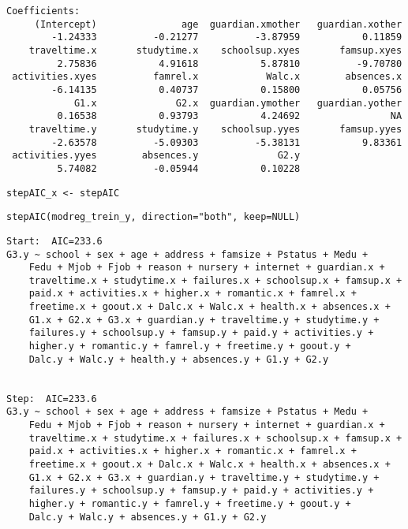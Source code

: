 \documentclass[11pt]{article}
\begin{document}
\begin{enumerate}
\begin{verbatim}
Coefficients:
     (Intercept)               age  guardian.xmother   guardian.xother  
        -1.24333          -0.21277          -3.87959           0.11859  
    traveltime.x       studytime.x    schoolsup.xyes       famsup.xyes  
         2.75836           4.91618           5.87810          -9.70780  
 activities.xyes          famrel.x            Walc.x        absences.x  
        -6.14135           0.40737           0.15800           0.05756  
            G1.x              G2.x  guardian.ymother   guardian.yother  
         0.16538           0.93793           4.24692                NA  
    traveltime.y       studytime.y    schoolsup.yyes       famsup.yyes  
        -2.63578          -5.09303          -5.38131           9.83361  
 activities.yyes        absences.y              G2.y  
         5.74082          -0.05944           0.10228  

\end{verbatim}

\begin{verbatim}
stepAIC_x <- stepAIC
\end{verbatim}

\begin{verbatim}
stepAIC(modreg_trein_y, direction="both", keep=NULL)
\end{verbatim}

\begin{verbatim}
Start:  AIC=233.6
G3.y ~ school + sex + age + address + famsize + Pstatus + Medu + 
    Fedu + Mjob + Fjob + reason + nursery + internet + guardian.x + 
    traveltime.x + studytime.x + failures.x + schoolsup.x + famsup.x + 
    paid.x + activities.x + higher.x + romantic.x + famrel.x + 
    freetime.x + goout.x + Dalc.x + Walc.x + health.x + absences.x + 
    G1.x + G2.x + G3.x + guardian.y + traveltime.y + studytime.y + 
    failures.y + schoolsup.y + famsup.y + paid.y + activities.y + 
    higher.y + romantic.y + famrel.y + freetime.y + goout.y + 
    Dalc.y + Walc.y + health.y + absences.y + G1.y + G2.y


Step:  AIC=233.6
G3.y ~ school + sex + age + address + famsize + Pstatus + Medu + 
    Fedu + Mjob + Fjob + reason + nursery + internet + guardian.x + 
    traveltime.x + studytime.x + failures.x + schoolsup.x + famsup.x + 
    paid.x + activities.x + higher.x + romantic.x + famrel.x + 
    freetime.x + goout.x + Dalc.x + Walc.x + health.x + absences.x + 
    G1.x + G2.x + G3.x + guardian.y + traveltime.y + studytime.y + 
    failures.y + schoolsup.y + famsup.y + paid.y + activities.y + 
    higher.y + romantic.y + famrel.y + freetime.y + goout.y + 
    Dalc.y + Walc.y + absences.y + G1.y + G2.y



\end{verbatim}
\end{enumerate}
\end{document}
